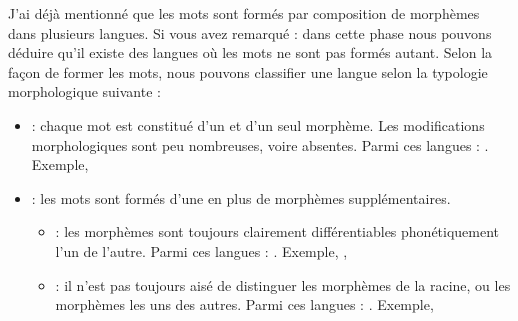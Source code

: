 \documentclass{KodeBook}
\begin{document}
J'ai déjà mentionné que les mots sont formés par composition de morphèmes dans plusieurs langues. 
Si vous avez remarqué : dans cette phase nous pouvons déduire qu'il existe des langues où les mots ne sont pas formés autant. 
Selon la façon de former les mots, nous pouvons classifier une langue selon la typologie morphologique suivante :
\begin{itemize}
	\item {} : chaque mot est constitué d'un et d'un seul morphème. 
	Les modifications morphologiques sont peu nombreuses, voire absentes. 
	Parmi ces langues : . 
	Exemple, 
	
	\item {} : les mots sont formés d'une  en plus de morphèmes supplémentaires.
	\begin{itemize}
		\item {} : les morphèmes sont toujours clairement différentiables phonétiquement l'un de l'autre. 
		Parmi ces langues : . 
		Exemple, , 
		
		\item {} : il n'est pas toujours aisé de distinguer les morphèmes de la racine, ou les morphèmes les uns des autres. 
		Parmi ces langues : .
		Exemple, 
	\end{itemize}
\end{itemize}
\end{document}
